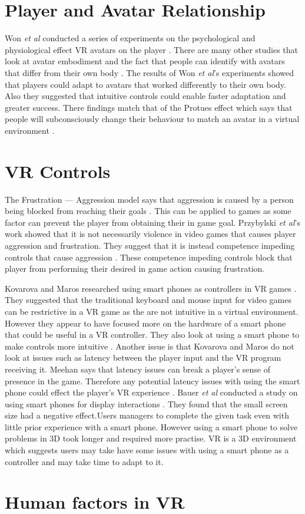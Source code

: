 \documentclass{scrartcl}
\begin{document}
\section{Player and Avatar Relationship}
Won \textit{et al} conducted a series of experiments on the psychological and physiological effect VR avatars on the player \cite{won2015homuncular}. There are many other studies that look at  avatar embodiment and the fact that people can identify with avatars that differ from their own body \cite{Groen, Latoschik}. The results of Won \textit{et al}'s experiments showed that players could adapt to avatars that worked differently to their own body. Also they suggested that intuitive controls could enable faster adaptation and greater success. There findings match that of the Protues effect which says that people will subconsciously change their behaviour to match an avatar in a virtual environment \cite{won2015homuncular, yee2007proteus}.


\section{VR Controls}
The Frustration --- Aggression model says that aggression is caused by a person being blocked from reaching their goals \cite{dollard1939frustration}.  This can be applied to games as some factor can prevent the player from obtaining their in game goal.  Przybylski \textit{et al}'s work showed that it is not necessarily violence in video games that causes player aggression and frustration. They suggest that it is instead competence impeding controls that cause aggression \cite{przybylski, przybylski2010motivational}. These competence impeding controls block that player from performing their desired in game action causing frustration. 


Kovarova and Maros researched using smart phones as controllers in VR games \cite{Kovarova}. They suggested that the traditional keyboard and mouse input for video games can be restrictive in a VR game as the are not intuitive in a virtual environment. However they appear to have focused more on the hardware of a smart phone that could be useful in a VR controller. They also look at using a smart phone to make controls more intuitive \cite{Kovarova}.
Another issue is that Kovarova and Maros do not look at issues such as latency between the player input and the VR program receiving it.  Meehan says that latency issues can break a player's sense of presence in the game. Therefore any potential latency issues with using the smart phone could effect the player's VR experience \cite{Meehan}.
Bauer \textit{et al} conducted a study on using smart phones for display interactions \cite{Bauer}. They found that the small screen size had a negative effect.Users managers to complete the given task even with little prior experience with a smart phone. However using a smart phone to solve problems in 3D took longer and required more practise. VR is a 3D environment which suggests users may take have some issues with using a smart phone as a controller and may take time to adapt to it. 
\section{Human factors in VR}

\cite{stanney}



	


	
\end{document}
